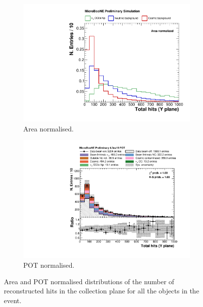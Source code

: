 \begin{figure}[htbp]
\centering
  \begin{subfigure}{0.49\textwidth}
    \includegraphics[width=\linewidth]{figures/h_total_hits_y_norm.pdf}
    \caption{Area normalised.} \label{fig:nhits_integral}
  \end{subfigure}
    \begin{subfigure}{0.49\textwidth}
    \includegraphics[width=\linewidth]{figures/h_total_hits_y.pdf}
    \caption{POT normalised.} \label{fig:nhits_pot}
  \end{subfigure}
  \caption{Area and POT normalised distributions of the number of reconstructed hits in the collection plane for all the objects in the event.}
\end{figure}


